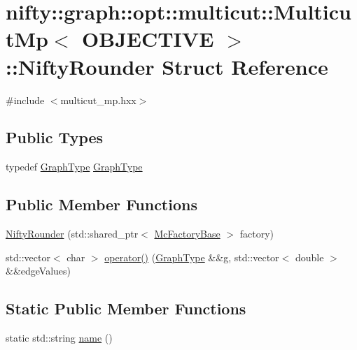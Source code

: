 \hypertarget{structnifty_1_1graph_1_1opt_1_1multicut_1_1MulticutMp_1_1NiftyRounder}{}\section{nifty\+:\+:graph\+:\+:opt\+:\+:multicut\+:\+:Multicut\+Mp$<$ O\+B\+J\+E\+C\+T\+I\+VE $>$\+:\+:Nifty\+Rounder Struct Reference}
\label{structnifty_1_1graph_1_1opt_1_1multicut_1_1MulticutMp_1_1NiftyRounder}


{\ttfamily \#include $<$multicut\+\_\+mp.\+hxx$>$}

\subsection*{Public Types}
\begin{DoxyCompactItemize}
\item 
typedef \hyperlink{structnifty_1_1graph_1_1opt_1_1multicut_1_1MulticutMp_1_1NiftyRounder_ace21bc91acedd0262f69e9ce90d44470}{Graph\+Type} \hyperlink{structnifty_1_1graph_1_1opt_1_1multicut_1_1MulticutMp_1_1NiftyRounder_ace21bc91acedd0262f69e9ce90d44470}{Graph\+Type}
\end{DoxyCompactItemize}
\subsection*{Public Member Functions}
\begin{DoxyCompactItemize}
\item 
\hyperlink{structnifty_1_1graph_1_1opt_1_1multicut_1_1MulticutMp_1_1NiftyRounder_a135c5a75da1598ae17b1933a5f6c0606}{Nifty\+Rounder} (std\+::shared\+\_\+ptr$<$ \hyperlink{classnifty_1_1graph_1_1opt_1_1multicut_1_1MulticutMp_ab1974bc35fb66895a3a7bfc820f9b78d}{Mc\+Factory\+Base} $>$ factory)
\item 
std\+::vector$<$ char $>$ \hyperlink{structnifty_1_1graph_1_1opt_1_1multicut_1_1MulticutMp_1_1NiftyRounder_a2d2afbc5c8cb14306626357b87dce1f1}{operator()} (\hyperlink{structnifty_1_1graph_1_1opt_1_1multicut_1_1MulticutMp_1_1NiftyRounder_ace21bc91acedd0262f69e9ce90d44470}{Graph\+Type} \&\&g, std\+::vector$<$ double $>$ \&\&edge\+Values)
\end{DoxyCompactItemize}
\subsection*{Static Public Member Functions}
\begin{DoxyCompactItemize}
\item 
static std\+::string \hyperlink{structnifty_1_1graph_1_1opt_1_1multicut_1_1MulticutMp_1_1NiftyRounder_a8c2d35c75c818ee7989b63867d291e53}{name} ()
\end{DoxyCompactItemize}


